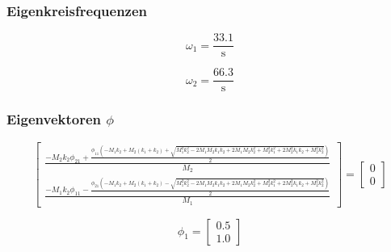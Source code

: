 \documentclass[
  letterpaper,
  DIV=11]{scrreprt}
\begin{document}
\hypertarget{eigenkreisfrequenzen-5}{%
\subsubsection{Eigenkreisfrequenzen}\label{eigenkreisfrequenzen-5}}

\begin{equation}\omega_{1} = \frac{33.1}{\text{s}}\end{equation}

\begin{equation}\omega_{2} = \frac{66.3}{\text{s}}\end{equation}

\hypertarget{eigenvektoren-phi-3}{%
\subsubsection{\texorpdfstring{Eigenvektoren
\(\phi\)}{Eigenvektoren \textbackslash phi}}\label{eigenvektoren-phi-3}}

\begin{equation}\left[\begin{matrix}\frac{- M_{2} k_{2} \phi_{21} + \frac{\phi_{11} \left(- M_{1} k_{2} + M_{2} \left(k_{1} + k_{2}\right) + \sqrt{M_{1}^{2} k_{2}^{2} - 2 M_{1} M_{2} k_{1} k_{2} + 2 M_{1} M_{2} k_{2}^{2} + M_{2}^{2} k_{1}^{2} + 2 M_{2}^{2} k_{1} k_{2} + M_{2}^{2} k_{2}^{2}}\right)}{2}}{M_{2}}\\\frac{- M_{1} k_{2} \phi_{11} - \frac{\phi_{21} \left(- M_{1} k_{2} + M_{2} \left(k_{1} + k_{2}\right) - \sqrt{M_{1}^{2} k_{2}^{2} - 2 M_{1} M_{2} k_{1} k_{2} + 2 M_{1} M_{2} k_{2}^{2} + M_{2}^{2} k_{1}^{2} + 2 M_{2}^{2} k_{1} k_{2} + M_{2}^{2} k_{2}^{2}}\right)}{2}}{M_{1}}\end{matrix}\right] = \left[\begin{matrix}0\\0\end{matrix}\right]\end{equation}

\begin{equation}\phi_{1} = \left[\begin{matrix}0.5\\1.0\end{matrix}\right]\end{equation}
\end{document}
